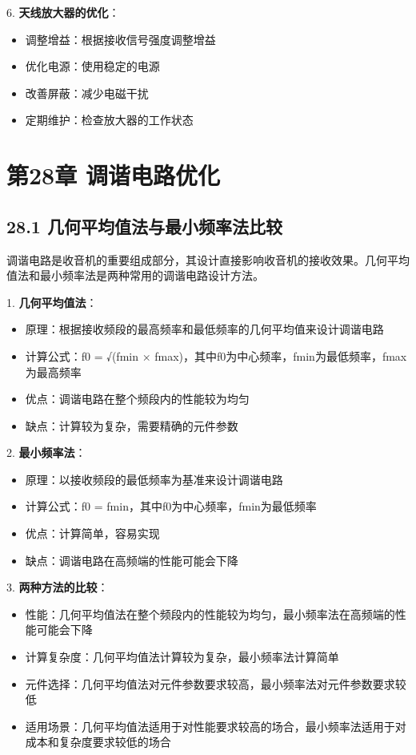 \documentclass[12pt,UTF8]{ctexbook}
\begin{document}
6. \textbf{天线放大器的优化}：
   \begin{itemize}[leftmargin=3.5em]
   \item 调整增益：根据接收信号强度调整增益
   \item 优化电源：使用稳定的电源
   \item 改善屏蔽：减少电磁干扰
   \item 定期维护：检查放大器的工作状态
   \end{itemize}

\chapter*{第28章 调谐电路优化}
\section*{28.1 几何平均值法与最小频率法比较}

调谐电路是收音机的重要组成部分，其设计直接影响收音机的接收效果。几何平均值法和最小频率法是两种常用的调谐电路设计方法。

1. \textbf{几何平均值法}：
   \begin{itemize}[leftmargin=3.5em]
   \item 原理：根据接收频段的最高频率和最低频率的几何平均值来设计调谐电路
   \item 计算公式：f0 = √(fmin × fmax)，其中f0为中心频率，fmin为最低频率，fmax为最高频率
   \item 优点：调谐电路在整个频段内的性能较为均匀
   \item 缺点：计算较为复杂，需要精确的元件参数
   \end{itemize}

2. \textbf{最小频率法}：
   \begin{itemize}[leftmargin=3.5em]
   \item 原理：以接收频段的最低频率为基准来设计调谐电路
   \item 计算公式：f0 = fmin，其中f0为中心频率，fmin为最低频率
   \item 优点：计算简单，容易实现
   \item 缺点：调谐电路在高频端的性能可能会下降
   \end{itemize}

3. \textbf{两种方法的比较}：
   \begin{itemize}[leftmargin=3.5em]
   \item 性能：几何平均值法在整个频段内的性能较为均匀，最小频率法在高频端的性能可能会下降
   \item 计算复杂度：几何平均值法计算较为复杂，最小频率法计算简单
   \item 元件选择：几何平均值法对元件参数要求较高，最小频率法对元件参数要求较低
   \item 适用场景：几何平均值法适用于对性能要求较高的场合，最小频率法适用于对成本和复杂度要求较低的场合
   \end{itemize}
\end{document}
